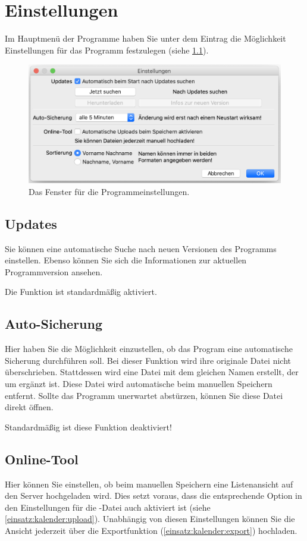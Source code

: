 \chapter{Einstellungen}\label{epl:allg:einstellungen}
Im Hauptmenü der Programme haben Sie unter dem Eintrag 
die Möglichkeit Einstellungen für das Programm festzulegen
(siehe \cref{fig:einstellungen}).
\begin{figure}[!h]
  \centering
	\includegraphics[width=.75\textwidth]{img/einstellungen}
	\caption{Das Fenster für die Programmeinstellungen.}
	\label{fig:einstellungen}
\end{figure}



\section{Updates}
Sie können eine automatische Suche nach neuen Versionen des Programms einstellen.
Ebenso können Sie sich die Informationen zur aktuellen Programmversion ansehen.

Die Funktion ist standardmäßig aktiviert.



\section{Auto-Sicherung}
Hier haben Sie die Möglichkeit einzustellen, ob das Program eine automatische Sicherung durchführen soll.
Bei dieser Funktion wird ihre originale Datei nicht überschrieben.
Stattdessen wird eine Datei mit dem gleichen Namen erstellt, der um  ergänzt ist.
Diese Datei wird automatische beim manuellen Speichern entfernt.
Sollte das Programm unerwartet abstürzen, können Sie diese Datei direkt öffnen.

Standardmäßig ist diese Funktion deaktiviert!



\section{Online-Tool}
Hier können Sie einstellen, ob beim manuellen Speichern eine Listenansicht auf den Server hochgeladen wird.
Dies setzt voraus, dass die entsprechende Option in den Einstellungen für die \EPL-Datei auch aktiviert ist
(siehe \cref{einsatz:kalender:upload}).
Unabhängig von diesen Einstellungen können Sie die Ansicht jederzeit über die Exportfunktion (\cref{einsatz:kalender:export}) hochladen.

